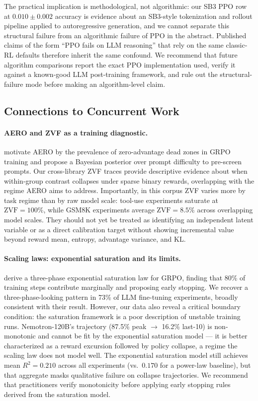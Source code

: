 \documentclass{article}
\begin{document}
The practical implication is methodological, not algorithmic: our
SB3 PPO row at $0.010 \pm 0.002$ accuracy is evidence about an
SB3-style tokenization and rollout pipeline applied to
autoregressive generation, and we cannot separate this structural
failure from an algorithmic failure of PPO in the abstract.
Published claims of the form ``PPO fails on LLM reasoning'' that
rely on the same classic-RL defaults therefore inherit the same
confound. We recommend that future algorithm comparisons report the
exact PPO implementation used, verify it against a known-good
LLM post-training framework, and rule out the structural-failure
mode before making an algorithm-level claim.

\subsection{Connections to Concurrent Work}
\label{sec:discuss_related}

\paragraph{AERO and ZVF as a training diagnostic.}
\citet{zhang2026aero} motivate AERO by the prevalence of zero-advantage dead
zones in GRPO training and propose a Bayesian posterior over prompt difficulty
to pre-screen prompts.
Our cross-library ZVF traces provide descriptive evidence about when
within-group contrast collapses under sparse binary rewards, overlapping with
the regime AERO aims to address.
Importantly, in this corpus ZVF varies more by task regime than by raw model
scale: tool-use experiments saturate at $\text{ZVF} = 100\%$, while GSM8K
experiments average $\text{ZVF} = 8.5\%$ across overlapping model scales.
They should not yet be treated as identifying an independent latent variable
or as a direct calibration target without showing incremental value beyond
reward mean, entropy, advantage variance, and KL.

\paragraph{Scaling laws: exponential saturation and its limits.}
\citet{nimmaturi2025scalinglaws} derive a three-phase exponential saturation
law for GRPO, finding that 80\% of training steps contribute marginally and
proposing early stopping.
We recover a three-phase-looking pattern in 73\% of LLM fine-tuning
experiments, broadly consistent with their result.
However, our data also reveal a critical boundary condition: the saturation
framework is a poor description of unstable training runs.
Nemotron-120B's trajectory (87.5\% peak $\to$ 16.2\% last-10) is
non-monotonic and cannot be fit by the exponential saturation model ---
it is better characterized as a reward excursion followed by policy
collapse, a regime the scaling law does not model well. The exponential
saturation model still achieves mean $R^{2} = 0.210$ across all experiments
(vs.\ $0.170$ for a power-law baseline), but that aggregate masks qualitative
failure on collapse trajectories.
We recommend that practitioners verify monotonicity before applying early
stopping rules derived from the saturation model.
\end{document}
